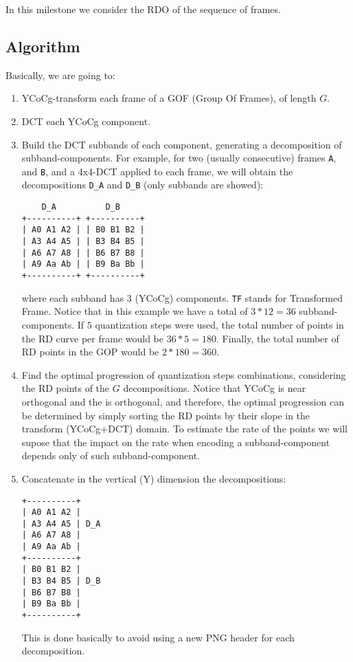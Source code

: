 In this milestone we consider the RDO of the sequence of frames.

\subsection{Algorithm}

Basically, we are going to:
\begin{enumerate}
\item YCoCg-transform each frame of a GOF (Group Of Frames), of length $G$.
\item DCT each YCoCg component.
\item Build the DCT subbands of each component, generating a
  decomposition of subband-components. For example, for two (usually
  consecutive) frames \verb|A|, and \verb|B|, and a 4x4-DCT applied to
  each frame, we will obtain the decompositions \verb|D_A| and
  \verb|D_B| (only subbands are showed):
\begin{verbatim}
    D_A          D_B
+----------+ +----------+
| A0 A1 A2 | | B0 B1 B2 |
| A3 A4 A5 | | B3 B4 B5 |
| A6 A7 A8 | | B6 B7 B8 |
| A9 Aa Ab | | B9 Ba Bb |
+----------+ +----------+
\end{verbatim}
  where each subband has 3 (YCoCg) components. \verb|TF| stands for
  Transformed Frame. Notice that in this example we have a total of
  $3*12=36$ subband-components. If $5$ quantization steps were used,
  the total number of points in the RD curve per frame would be
  $36*5=180$. Finally, the total number of RD points in the GOP would
  be $2*180=360$.

\item Find the optimal progression of quantization steps combinations,
  considering the RD points of the $G$ decompositions. Notice that
  YCoCg is near orthogonal and the is orthogonal, and therefore, the
  optimal progression can be determined by simply sorting the RD
  points by their slope in the transform (YCoCg+DCT) domain. To
  estimate the rate of the points we will supose that the impact on
  the rate when encoding a subband-component depends only of such
  subband-component.
  
\item Concatenate in the vertical (Y) dimension the decompositions:
\begin{verbatim}
+----------+
| A0 A1 A2 |
| A3 A4 A5 | D_A
| A6 A7 A8 | 
| A9 Aa Ab |
+----------+ 
| B0 B1 B2 |
| B3 B4 B5 | D_B
| B6 B7 B8 |
| B9 Ba Bb |
+----------+
\end{verbatim}
  This is done basically to avoid using a new PNG header for each
  decomposition.
\end{enumerate}


